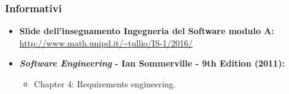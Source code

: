 \subsubsection{Informativi}
\begin{itemize}
	\item \textbf{Slide dell'insegnamento Ingegneria del Software modulo A:}
	\url{http://www.math.unipd.it/~tullio/IS-1/2016/}
	\item \textbf{\textit{Software Engineering} - Ian Sommerville - 9th Edition (2011):}
	\begin{itemize}
		\item Chapter 4: Requirements engineering.
	\end{itemize} 
\end{itemize}